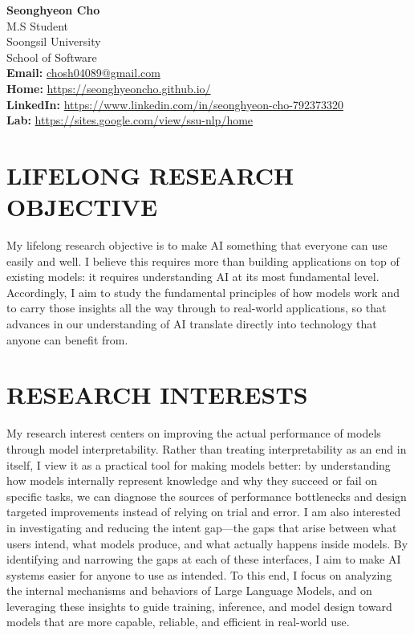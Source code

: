 \documentclass[10pt,a4paper]{article} %
\newcommand{\seclabel}[1]{\section*{\uppercase{#1}}}
\begin{document}
\begin{center}
    \textbf{\Huge{Seonghyeon Cho}} \\ \vspace{1.0em}
    M.S Student \\ Soongsil University \\ School of Software \\
    \textbf{Email: }\href{mailto:chosh04089@gmail.com}{chosh04089@gmail.com} \\
    \textbf{Home: }\url{https://seonghyeoncho.github.io/} \\
    \textbf{LinkedIn: }\url{https://www.linkedin.com/in/seonghyeon-cho-792373320} \\
    \textbf{Lab: }\url{https://sites.google.com/view/ssu-nlp/home}
\end{center}

\vspace{1em}

\seclabel{Lifelong Research Objective}
\small{My lifelong research objective is to make AI something that everyone can use easily and well. I believe this requires more than building applications on top of existing models: it requires understanding AI at its most fundamental level. Accordingly, I aim to study the fundamental principles of how models work and to carry those insights all the way through to real-world applications, so that advances in our understanding of AI translate directly into technology that anyone can benefit from.}

\seclabel{Research Interests}
\small{My research interest centers on improving the actual performance of models through model interpretability. Rather than treating interpretability as an end in itself, I view it as a practical tool for making models better: by understanding how models internally represent knowledge and why they succeed or fail on specific tasks, we can diagnose the sources of performance bottlenecks and design targeted improvements instead of relying on trial and error. I am also interested in investigating and reducing the intent gap---the gaps that arise between what users intend, what models produce, and what actually happens inside models. By identifying and narrowing the gaps at each of these interfaces, I aim to make AI systems easier for anyone to use as intended. To this end, I focus on analyzing the internal mechanisms and behaviors of Large Language Models, and on leveraging these insights to guide training, inference, and model design toward models that are more capable, reliable, and efficient in real-world use.}
\end{document}
